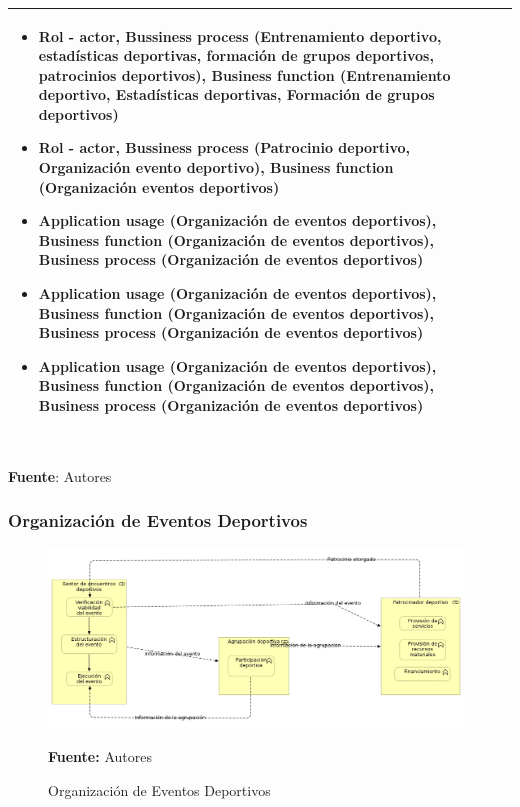 \begin{table}[!htb]
\begin{center}
{\begin{tabular}{|p{7cm}|p{4cm}|}
\begin{itemize}
				\item Rol - actor, Bussiness process (Entrenamiento deportivo, estadísticas deportivas, formación de grupos deportivos, patrocinios deportivos), Business function (Entrenamiento deportivo, Estadísticas deportivas, Formación de grupos deportivos)
				\item Rol - actor, Bussiness process (Patrocinio deportivo, Organización evento deportivo), Business function (Organización eventos deportivos)
				\item Application usage (Organización de eventos deportivos), Business function (Organización de eventos deportivos), Business process (Organización de eventos deportivos)
				\item Application usage (Organización de eventos deportivos), Business function (Organización de eventos deportivos), Business process (Organización de eventos deportivos)
				\item Application usage (Organización de eventos deportivos), Business function (Organización de eventos deportivos), Business process (Organización de eventos deportivos)
			\end{itemize} 
			\\
			\hline
		\end{tabular}
		} \\
		\textbf{Fuente}: Autores
	\end{center}
\end{table}

\subsubsection{Organización de Eventos Deportivos}

\begin{figure}[!htb]
  \begin{center}
    \includegraphics[width=11cm]{./imagenes/business_functions/organizacioneventosdeportivos.png}
    \caption{Organización de Eventos Deportivos}
    \label{fig:bf_organizacion_eventos_deportivos}
    \textbf{Fuente:}  Autores
  \end{center}
\end{figure}

